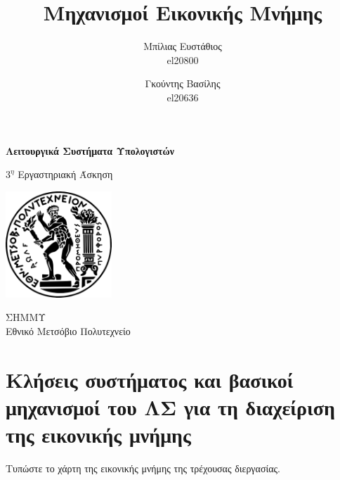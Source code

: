 \documentclass[12pt]{article}
\begin{document}
\author{
    Μπίλιας Ευστάθιος
    \\el20800
    \and
    Γκούντης Βασίλης
    \\el20636
}


\title{Μηχανισμοί Εικονικής Μνήμης}

\begin{titlepage}
    \begin{center}

        \Huge
        \textbf{Λειτουργικά Συστήματα Υπολογιστών}

        \vspace{0.5cm}
        \LARGE
        $3^η$ Εργαστηριακή Άσκηση      

        \vspace{0.3cm}
        {\vspace{-2em}\let\newpage\relax\maketitle\vspace{-2em}}

        \vspace{0.8cm}

        \includegraphics[width=0.3\textwidth]{logo.png}

        \vspace{0.8cm}
        \Large
        ΣΗΜΜΥ\\
        Εθνικό Μετσόβιο Πολυτεχνείο\\

    \end{center}
\end{titlepage}

\tableofcontents
\setcounter{page}{2}
\pagebreak

\section{Κλήσεις συστήματος και βασικοί μηχανισμοί του ΛΣ για τη διαχείριση της
εικονικής μνήμης}


\begin{question}
Τυπώστε το χάρτη της εικονικής μνήμης της τρέχουσας διεργασίας.
\end{question}
\end{document}
